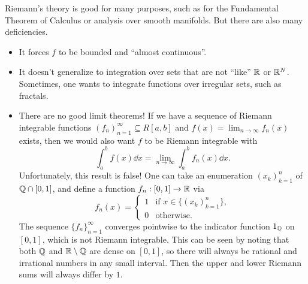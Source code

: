 Riemann's theory is good for many purposes, such as for the Fundamental 
Theorem of Calculus or analysis over smooth manifolds. But there are also 
many deficiencies. 
\begin{itemize}
    \item It forces $f$ to be bounded and ``almost continuous''. 
    \item It doesn't generalize to integration over sets that are not ``like''
    $\mathbb{R}$ or $\mathbb{R}^N$. Sometimes, one wants to integrate functions over 
    irregular sets, such as fractals. 
    \item There are no good limit theorems! If we have a 
    sequence of Riemann integrable functions $(f_n)_{n=1}^\infty \subseteq 
    R[a, b]$ and $f(x) = \lim_{n\to\infty} f_n(x)$ exists, then we would also 
    want $f$ to be Riemann integrable with 
    \[ \int_a^b f(x)\dd x = \lim_{n\to\infty} \int_a^b f_n(x)\dd x. \] 
    Unfortunately, this result is false! One can take an enumeration 
    $(x_k)_{k=1}^n$ of $\mathbb{Q} \cap [0, 1]$, and define a function $f_n 
    : [0, 1] \to \mathbb{R}$ via 
    \[ f_n(x) = \begin{cases} 
        1 & \text{if } x \in \{(x_k)_{k=1}^n\}, \\
        0 & \text{otherwise.}
    \end{cases} \] 
    The sequence $\{f_n\}_{n=1}^\infty$ converges pointwise to the 
    indicator function $1_{\mathbb{Q}}$ on $[0, 1]$, which is not Riemann integrable. 
    This can be seen by noting that both $\mathbb{Q}$ and $\mathbb{R} \setminus \mathbb{Q}$ are dense 
    on $[0, 1]$, so there will always be rational and irrational numbers 
    in any small interval. Then the upper and lower Riemann sums will always 
    differ by $1$. 
\end{itemize}